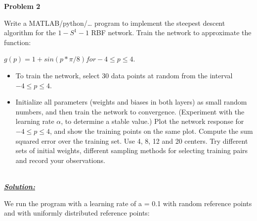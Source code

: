 \documentclass{article}
\begin{document}
  



\newpage
\noindent \textbf{Problem 2}

\noindent Write a MATLAB/python/… program to implement the steepest descent algorithm for the $ 1-S^1-1$ RBF network. 
Train the network to approximate the function:
\begin{center}
    $g(p) = 1 +sin(p*\pi/8) for -4 \leq p \leq 4$.    
\end{center}  

\begin{itemize}
    \item To train the network, select 30 data points at random from the interval $-4 \leq p \leq 4$.
    \item Initialize all parameters (weights and biases in both layers) as small random numbers, 
    and then train the network to convergence. (Experiment with the learning rate $\alpha$, to 
    determine a stable value.) Plot the network response for $-4 \leq p \leq 4$, and show the 
    training points on the same plot. Compute the sum squared error over the training 
    set. Use 4, 8, 12 and 20 centers. Try different sets of initial weights, different 
    sampling methods for selecting training pairs and record your observations. \\ \\
\end{itemize}

\noindent \underline{\textbf{\textit{Solution:}}}

\noindent 
We run the program with a learning rate of a = 0.1 with random reference points and with uniformly distributed reference points:
\end{document}
